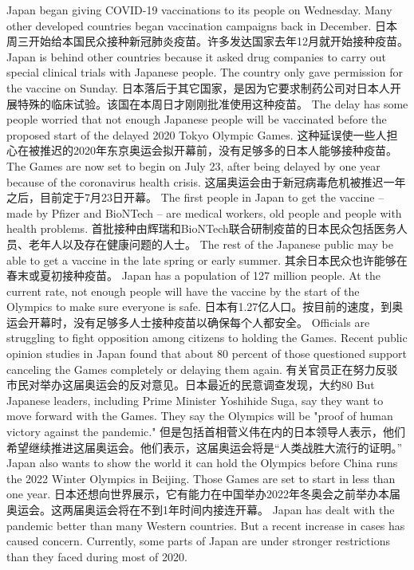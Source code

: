 Japan began giving COVID-19 vaccinations to its people on Wednesday. Many other developed countries began vaccination campaigns back in December.
日本周三开始给本国民众接种新冠肺炎疫苗。许多发达国家去年12月就开始接种疫苗。
Japan is behind other countries because it asked drug companies to carry out special clinical trials with Japanese people. The country only gave permission for the vaccine on Sunday.
日本落后于其它国家，是因为它要求制药公司对日本人开展特殊的临床试验。该国在本周日才刚刚批准使用这种疫苗。
The delay has some people worried that not enough Japanese people will be vaccinated before the proposed start of the delayed 2020 Tokyo Olympic Games.
这种延误使一些人担心在被推迟的2020年东京奥运会拟开幕前，没有足够多的日本人能够接种疫苗。
The Games are now set to begin on July 23, after being delayed by one year because of the coronavirus health crisis.
这届奥运会由于新冠病毒危机被推迟一年之后，目前定于7月23日开幕。
The first people in Japan to get the vaccine -- made by Pfizer and BioNTech -- are medical workers, old people and people with health problems.
首批接种由辉瑞和BioNTech联合研制疫苗的日本民众包括医务人员、老年人以及存在健康问题的人士。
The rest of the Japanese public may be able to get a vaccine in the late spring or early summer.
其余日本民众也许能够在春末或夏初接种疫苗。
Japan has a population of 127 million people. At the current rate, not enough people will have the vaccine by the start of the Olympics to make sure everyone is safe.
日本有1.27亿人口。按目前的速度，到奥运会开幕时，没有足够多人士接种疫苗以确保每个人都安全。
Officials are struggling to fight opposition among citizens to holding the Games. Recent public opinion studies in Japan found that about 80 percent of those questioned support canceling the Games completely or delaying them again.
有关官员正在努力反驳市民对举办这届奥运会的反对意见。日本最近的民意调查发现，大约80%
But Japanese leaders, including Prime Minister Yoshihide Suga, say they want to move forward with the Games. They say the Olympics will be "proof of human victory against the pandemic."
但是包括首相菅义伟在内的日本领导人表示，他们希望继续推进这届奥运会。他们表示，这届奥运会将是“人类战胜大流行的证明。”
Japan also wants to show the world it can hold the Olympics before China runs the 2022 Winter Olympics in Beijing. Those Games are set to start in less than one year.
日本还想向世界展示，它有能力在中国举办2022年冬奥会之前举办本届奥运会。这两届奥运会将在不到1年时间内接连开幕。
Japan has dealt with the pandemic better than many Western countries. But a recent increase in cases has caused concern. Currently, some parts of Japan are under stronger restrictions than they faced during most of 2020.
